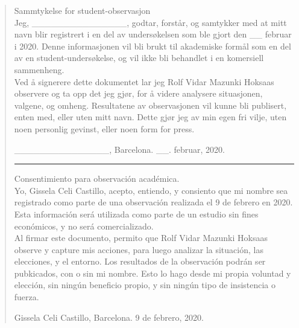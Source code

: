 \documentclass{../../myassignment}
\begin{document}
	\begin{quote}
		Sammtykelse for student-observasjon\\

		Jeg, \_\_\_\_\_\_\_\_\_\_\_\_\_\_\_, godtar, forst{\aa}r, og samtykker med at mitt navn blir registrert i en del av unders{\o}kelsen som ble gjort den \_\_ februar i 2020. Denne informasjonen vil bli brukt til akademiske form{\aa}l som en del av en student-unders{\o}kelse, og vil ikke bli behandlet i en komersiell sammenheng.\\

		Ved {\aa} signerere dette dokumentet lar jeg Rolf Vidar Mazunki Hoksaas observere og ta opp det jeg gj{\o}r, for {\aa} videre analysere situasjonen, valgene, og omheng. Resultatene av observasjonen vil kunne bli publisert, enten med, eller uten mitt navn. Dette gj{\o}r jeg av min egen fri vilje, uten noen personlig gevinst, eller noen form for press. 

		\vspace{1cm}

		\_\_\_\_\_\_\_\_\_\_\_\_\_\_\_, Barcelona. \_\_. februar, 2020.

		\vspace{5mm}\hrule\vspace{5mm}
	
		Consentimiento para observaci\'on acad\'emica.\\

		Yo, Gissela Celi Castillo, acepto, entiendo, y consiento que mi nombre sea registrado como parte de una observaci\'on realizada el 9 de febrero en 2020. Esta informaci\'on ser\'a utilizada como parte de un estudio sin fines econ\'omicos, y no ser\'a comercializado.\\

		Al firmar este documento, permito que Rolf Vidar Mazunki Hoksaas observe y capture mis acciones, para luego analizar la situaci\'on, las elecciones, y el entorno. Los resultados de la observaci\'on podr\'an ser pubkicados, con o sin mi nombre. Esto lo hago desde mi propia voluntad y elecci\'on, sin ning\'un beneficio propio, y sin ning\'un tipo de insistencia o fuerza. 

		\vspace{1cm}

		Gissela Celi Castillo, Barcelona. 9 de febrero, 2020.
	\end{quote}
\end{document}
